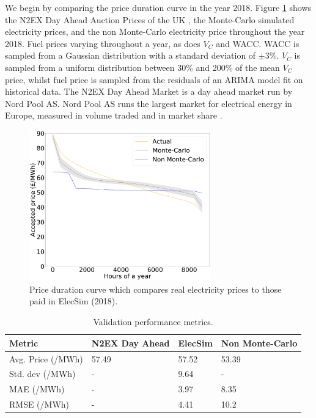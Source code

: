 We begin by comparing the price duration curve in the year 2018. Figure \ref{fig:price_duration_curve} shows the N2EX Day Ahead Auction Prices of the UK \cite{nordpool_2019}, the Monte-Carlo simulated electricity prices, and the non Monte-Carlo electricity price throughout the year 2018. Fuel prices varying throughout a year, as does $V_C$ and WACC. WACC is sampled from a Gaussian distribution with a standard deviation of $\pm3$\%. $V_C$ is sampled from a uniform distribution between 30\% and 200\% of the mean $V_C$ price, whilst fuel price is sampled from the residuals of an ARIMA model fit on historical data. The N2EX Day Ahead Market is a day ahead market run by Nord Pool AS. Nord Pool AS runs the largest market for electrical energy in Europe, measured in volume traded and in market share \cite{nordpool_2019}.
\begin{figure}
	\begin{center}
		\includegraphics[width=0.7\textwidth]{Chapter4/figures/load_price_duration_curve_comparison-monte-carlo.pdf}
		\caption{Price duration curve which compares real electricity prices to those paid in ElecSim (2018).}
		\label{fig:price_duration_curve}
	\end{center}
\end{figure}



\begin{table}[]
	\begin{tabular}{p{4cm}p{4cm}p{2.5cm}p{3cm}}
		\hline
		Metric & N2EX Day Ahead & ElecSim & Non Monte-Carlo \\ \hline
		Avg. Price (\textsterling/MWh) & 57.49 & 57.52 & 53.39 \\
		Std. dev (\textsterling/MWh) & - & 9.64 & - \\
		MAE (\textsterling/MWh) & - & 3.97 & 8.35 \\
		RMSE (\textsterling/MWh) & - & 4.41 & 10.2 \\ \hline
	\end{tabular}
	\caption{Validation performance metrics.}
	\label{table:validation_metrics}
\end{table}


